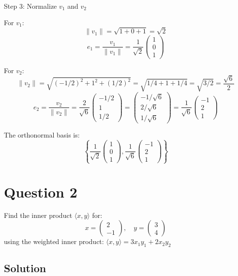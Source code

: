\documentclass[12pt]{article}
\begin{document}
Step 3: Normalize $v_1$ and $v_2$

For $v_1$:
\[
\|v_1\| = \sqrt{1 + 0 + 1} = \sqrt{2}
\]
\[
e_1 = \frac{v_1}{\|v_1\|} = \frac{1}{\sqrt{2}} \begin{pmatrix} 1 \\ 0 \\ 1 \end{pmatrix}
\]

For $v_2$:
\[
\|v_2\| = \sqrt{(-1/2)^2 + 1^2 + (1/2)^2} = \sqrt{1/4 + 1 + 1/4} = \sqrt{3/2} = \frac{\sqrt{6}}{2}
\]
\[
e_2 = \frac{v_2}{\|v_2\|} = \frac{2}{\sqrt{6}} \begin{pmatrix} -1/2 \\ 1 \\ 1/2 \end{pmatrix} = \begin{pmatrix} -1/\sqrt{6} \\ 2/\sqrt{6} \\ 1/\sqrt{6} \end{pmatrix} = \frac{1}{\sqrt{6}} \begin{pmatrix} -1 \\ 2 \\ 1 \end{pmatrix}
\]

The orthonormal basis is:
\[
\left\{ \frac{1}{\sqrt{2}} \begin{pmatrix} 1 \\ 0 \\ 1 \end{pmatrix}, \frac{1}{\sqrt{6}} \begin{pmatrix} -1 \\ 2 \\ 1 \end{pmatrix} \right\}
\]

\section*{Question 2}
Find the inner product $\langle x, y \rangle$ for:
\[
x = \begin{pmatrix} 2 \\ -1 \end{pmatrix}, \quad y = \begin{pmatrix} 3 \\ 4 \end{pmatrix}
\]
using the weighted inner product: $\langle x, y \rangle = 3x_1y_1 + 2x_2y_2$

\subsection*{Solution}
\end{document}
